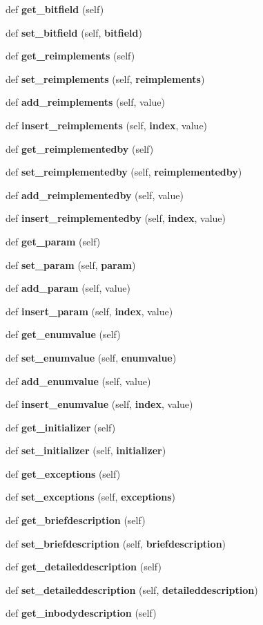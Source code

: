 \begin{DoxyCompactItemize}
def {\bf get\+\_\+bitfield} (self)
\item 
def {\bf set\+\_\+bitfield} (self, {\bf bitfield})
\item 
def {\bf get\+\_\+reimplements} (self)
\item 
def {\bf set\+\_\+reimplements} (self, {\bf reimplements})
\item 
def {\bf add\+\_\+reimplements} (self, value)
\item 
def {\bf insert\+\_\+reimplements} (self, {\bf index}, value)
\item 
def {\bf get\+\_\+reimplementedby} (self)
\item 
def {\bf set\+\_\+reimplementedby} (self, {\bf reimplementedby})
\item 
def {\bf add\+\_\+reimplementedby} (self, value)
\item 
def {\bf insert\+\_\+reimplementedby} (self, {\bf index}, value)
\item 
def {\bf get\+\_\+param} (self)
\item 
def {\bf set\+\_\+param} (self, {\bf param})
\item 
def {\bf add\+\_\+param} (self, value)
\item 
def {\bf insert\+\_\+param} (self, {\bf index}, value)
\item 
def {\bf get\+\_\+enumvalue} (self)
\item 
def {\bf set\+\_\+enumvalue} (self, {\bf enumvalue})
\item 
def {\bf add\+\_\+enumvalue} (self, value)
\item 
def {\bf insert\+\_\+enumvalue} (self, {\bf index}, value)
\item 
def {\bf get\+\_\+initializer} (self)
\item 
def {\bf set\+\_\+initializer} (self, {\bf initializer})
\item 
def {\bf get\+\_\+exceptions} (self)
\item 
def {\bf set\+\_\+exceptions} (self, {\bf exceptions})
\item 
def {\bf get\+\_\+briefdescription} (self)
\item 
def {\bf set\+\_\+briefdescription} (self, {\bf briefdescription})
\item 
def {\bf get\+\_\+detaileddescription} (self)
\item 
def {\bf set\+\_\+detaileddescription} (self, {\bf detaileddescription})
\item 
def {\bf get\+\_\+inbodydescription} (self)
\item 

\end{DoxyCompactItemize}
